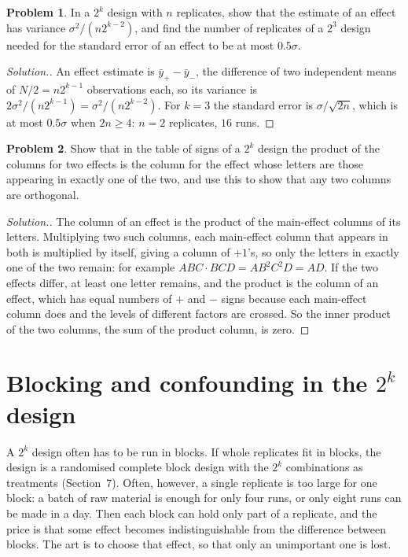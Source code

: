 \documentclass[11pt,a4paper]{article}
\numberwithin{equation}{section}
\theoremstyle{definition}
\newtheorem{problemx}{Problem}[subsection]
\newenvironment{problem}{\begin{problemx}}{\end{problemx}}
\newenvironment{solution}
  {\renewcommand{\qedsymbol}{}\begin{proof}[\textit{Solution}.]}
  {\end{proof}}
\begin{document}
\begin{problem}
In a $2^k$ design with $n$ replicates, show that the estimate of an effect has variance $\sigma^2/(n2^{k-2})$, and find the number of replicates of a $2^3$ design
needed for the standard error of an effect to be at most $0.5\sigma$.
\end{problem}

\begin{solution}
An effect estimate is $\bar y_+ - \bar y_-$, the difference of two independent means of $N/2 = n2^{k-1}$ observations each, so its variance is
$2\sigma^2/(n2^{k-1}) = \sigma^2/(n2^{k-2})$. For $k = 3$ the standard error is $\sigma/\sqrt{2n}$, which is at most $0.5\sigma$ when $2n \ge 4$: $n = 2$ replicates, $16$ runs.
\end{solution}

\begin{problem}
Show that in the table of signs of a $2^k$ design the product of the columns for two effects is the column for the effect whose letters are those
appearing in exactly one of the two, and use this to show that any two columns are orthogonal.
\end{problem}

\begin{solution}
The column of an effect is the product of the main-effect columns of its letters. Multiplying two such columns, each main-effect column that
appears in both is multiplied by itself, giving a column of $+1$'s, so only the letters in exactly one of the two remain: for example $ABC \cdot BCD = AB^2C^2D = AD$.
If the two effects differ, at least one letter remains, and the product is the column of an effect, which has equal numbers of $+$ and $-$ signs because
each main-effect column does and the levels of different factors are crossed. So the inner product of the two columns, the sum of the
product column, is zero.
\end{solution}

\section{Blocking and confounding in the $2^k$ design}
A $2^k$ design often has to be run in blocks. If whole replicates fit in blocks, the design is a randomised complete block design with the $2^k$
combinations as treatments (Section~7). Often, however, a single replicate is too large for one block: a batch of raw material is enough for only
four runs, or only eight runs can be made in a day. Then each block can hold only part of a replicate, and the price is that some effect becomes
indistinguishable from the difference between blocks. The art is to choose that effect, so that only an unimportant one is lost.
\end{document}
